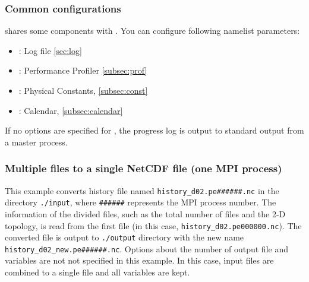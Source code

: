 \subsubsection{Common configurations}

\sno shares some components with \scalerm. You can configure following namelist
parameters:

\begin{itemize}
 \item {}: Log file \ref{sec:log}
 \item {}: Performance Profiler \ref{subsec:prof}
 \item {}: Physical Constants, \ref{subsec:const}
 \item {}: Calendar, \ref{subsec:calendar}
\end{itemize}

If no options are specified for , the progress log is output to standard output from a master process.

\subsubsection{Multiple \scalenetcdf files to a single NetCDF file (one MPI process)}


This example converts history file named \verb|history_d02.pe######.nc| in the directory \verb|./input|, where \verb|######| represents the MPI process number.
The information of the divided files, such as the total number of files and the 2-D topology, is read from the first file (in this case, \verb|history_d02.pe000000.nc|). The converted file is output to \verb|./output| directory with the new name \verb|history_d02_new.pe######.nc|.
Options about the number of output file and variables are not not specified in this example. In this case, input files are combined to a single file and all variables are kept.

